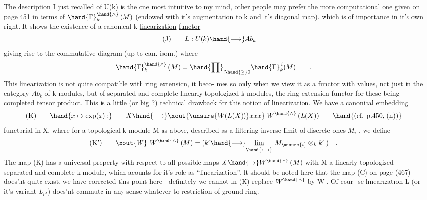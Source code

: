 
The description I just recalled of U(k) is the one most intuitive to
my mind,  other people may prefer the more computational one given on
page 451 in terms of $\hand{\Gamma}_k^{\hand{\wedge}}\,(M)$  (endowed with it's augmentation to k and it's
diagonal map),  which is of importance in it's own right.  It shows
the existence of a canonical k-\uline{linearization} \uline{functor}
\[ \text{(J)} \qquad L : U(k) \hand{\longrightarrow} Ab_k \quad , \]
giving rise to the commutative diagram (up to can. isom.)
where
\[ \hand{\Gamma}_k^{\hand{\wedge}}\,(M) = \hand{\prod}_{i\hand{\geq}0} \hand{\Gamma}_k^{\,i}(M) \qquad . \]
This linearization is not quite compatible with ring extension,  it beco-%
mes so only when we view it as a functor with values,  not just in the
category $Ab_k$ of k-modules,  but of separated and complete 
linearly topologized k-modules,  the ring extension functor for these
being \uline{completed} tensor product.  This is a little (or big ?) technical
 drawback for this notion of linearization.  We have a canonical embedding
\[ \text{(K)} \qquad \hand{x \mapsto \exp(x) :} \qquad X \hand{\longrightarrow} \xout{\unsure{W(L(X))}xxx}\ W^{\hand{\wedge}}\,(L(X)) \qquad \hand{\text{(cf. p.450, (n))}} \]
functorial in X,   where for a topological k-module M
as above,  described as a filtering inverse limit of discrete ones $M_i$ ,
we define
\[ \text{(K')} \qquad \xout{W}\ W^{\hand{\wedge}}\,(M) = (k' \hand{\longmapsto} \underset{\hand{\leftarrow\, i}}{\underline{\lim}}\ M_{\unsure{i}} \otimes_k k' \ ) \quad . \]
The map (K) has a universal property with respect to all possible maps
$X \hand{\to} W^{\hand{\wedge}}\,(M)$  with M a linearly topologized separated and complete k-module,
which acounts for it's role as ``linearization''.  It should be noted here
that the map (C) on page (467) does'nt quite exist,  we have corrected
this point here -  definitely we cannot in (K) replace $W^{\hand{\wedge}}$ by W .  Of cour-%
se linearization L (or it's variant $L_{pt}$)  does'nt commute in any sense
whatever to restriction of ground ring.


